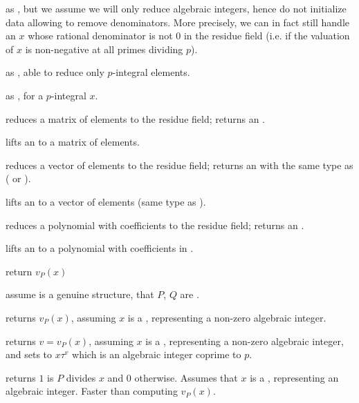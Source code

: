  as , but we assume we
will only reduce algebraic integers, hence do not initialize data allowing to
remove denominators. More precisely, we can in fact still handle an $x$ whose
rational denominator is not $0$ in the residue field (i.e. if the valuation
of $x$ is non-negative at all primes dividing $p$).

 as
, able to reduce only $p$-integral elements.

 as , for
a $p$-integral $x$.

 reduces a matrix
of  elements to the residue field; returns an .

 lifts an  to a matrix of
 elements.

 reduces a vector
of  elements to the residue field; returns an 
with the same type as  ( or ).

 lifts an  to a vector of
 elements (same type as ).

 reduces a polynomial
with  coefficients to the residue field; returns an .

 lifts an  to a polynomial
with coefficients in .


 return $v_P(x)$

 assume  is a genuine 
structure, that $P$, $Q$ are .

 returns $v_P(x)$,
assuming $x$ is a , representing a non-zero algebraic integer.

 returns $v = v_P(x)$,
assuming $x$ is a , representing a non-zero algebraic integer, and sets
 to $x\tau^v$ which is an algebraic integer coprime to $p$.

 returns $1$ is $P$ divides $x$ and
$0$ otherwise. Assumes that $x$ is a , representing an algebraic
integer. Faster than computing $v_P(x)$.

